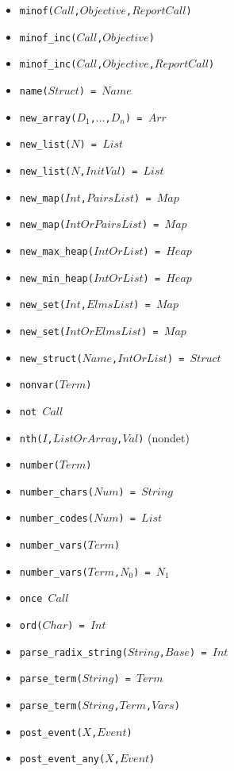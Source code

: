 \documentclass[10pt]{article}
\begin{document}
\begin{multicols}{2}
\begin{scriptsize}
\begin{itemize}
    \item \texttt{minof($Call$,$Objective$,$ReportCall$)}
    \item \texttt{minof\_inc($Call$,$Objective$)}
    \item \texttt{minof\_inc($Call$,$Objective$,$ReportCall$)}
    \item \texttt{name($Struct$) = $Name$}
    \item \texttt{new\_array($D_1$,$\ldots$,$D_n$) = $Arr$}
    \item \texttt{new\_list($N$) = $List$}
    \item \texttt{new\_list($N$,$InitVal$) = $List$}
    \item \texttt{new\_map($Int$,$PairsList$) = $Map$}
    \item \texttt{new\_map($IntOrPairsList$) = $Map$}
    \item \texttt{new\_max\_heap($IntOrList$) = $Heap$}
    \item \texttt{new\_min\_heap($IntOrList$) = $Heap$}
    \item \texttt{new\_set($Int$,$ElmsList$) = $Map$}
    \item \texttt{new\_set($IntOrElmsList$) = $Map$}
    \item \texttt{new\_struct($Name$,$IntOrList$) = $Struct$}
    \item \texttt{nonvar($Term$)}
    \item \texttt{not $Call$}
    \item \texttt{nth($I$,$ListOrArray$,$Val$)} (nondet)
    \item \texttt{number($Term$)}
    \item \texttt{number\_chars($Num$) = $String$}
    \item \texttt{number\_codes($Num$) = $List$}
    \item \texttt{number\_vars($Term$)}
    \item \texttt{number\_vars($Term$,$N_0$) = $N_1$}
    \item \texttt{once $Call$}
    \item \texttt{ord($Char$) = $Int$}
    \item \texttt{parse\_radix\_string($String$,$Base$) = $Int$}
    \item \texttt{parse\_term($String$) = $Term$}
    \item \texttt{parse\_term($String$,$Term$,$Vars$)}
    \item \texttt{post\_event($X$,$Event$)}
    \item \texttt{post\_event\_any($X$,$Event$)}

\end{itemize}
\end{scriptsize}
\end{multicols}
\end{document}
